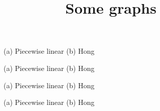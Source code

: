 \documentclass[12pt]{article}
\begin{document}
\pagestyle{empty}

\title{Some graphs}
\maketitle

\begin{figure}
\begin{center}
\begin{minipage}{6.50in}
\centerline{
\hfill
{}
}
\hfill
\hfill
(a) Piecewise linear
\hfill
\hfill
\hfill
\hfill
(b) Hong
\hfill
\hfill
\hfill
\end{minipage}
\caption{}
\end{center}
\end{figure}

\begin{figure}
\begin{center}
\begin{minipage}{6.50in}
\centerline{
\hfill
{}
}
\hfill
\hfill
(a) Piecewise linear
\hfill
\hfill
\hfill
\hfill
(b) Hong
\hfill
\hfill
\hfill
\end{minipage}
\caption{}
\end{center}
\end{figure}

\begin{figure}
\begin{center}
\begin{minipage}{6.50in}
\centerline{
\hfill
{}
}
\hfill
\hfill
(a) Piecewise linear
\hfill
\hfill
\hfill
\hfill
(b) Hong
\hfill
\hfill
\hfill
\end{minipage}
\caption{}
\end{center}
\end{figure}

\begin{figure}
\begin{center}
\begin{minipage}{6.50in}
\centerline{
\hfill
{}
}
\hfill
\hfill
(a) Piecewise linear
\hfill
\hfill
\hfill
\hfill
(b) Hong
\hfill
\hfill
\hfill
\end{minipage}
\caption{}
\end{center}
\end{figure}
\end{document}
